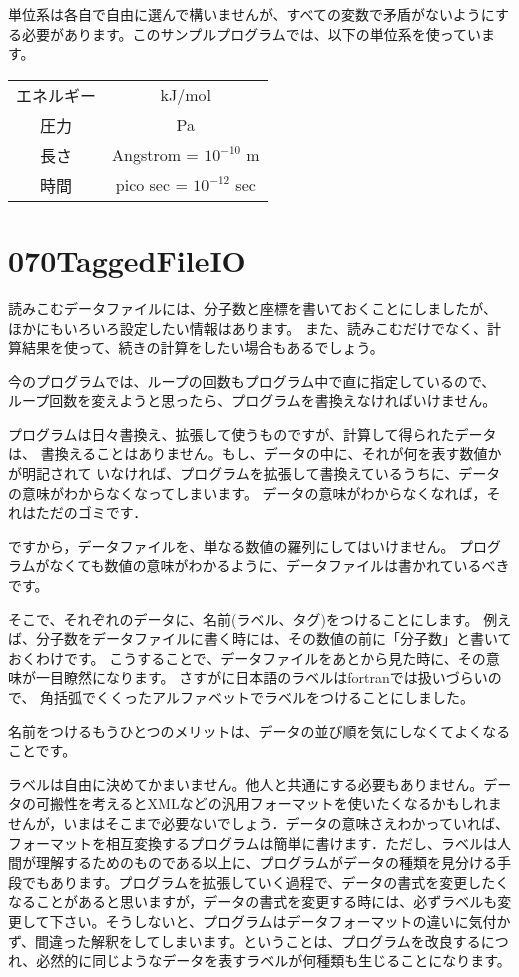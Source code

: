\documentclass[a4,10pt]{article}
\begin{document}
単位系は各自で自由に選んで構いませんが、すべての変数で矛盾がないようにする必要があります。このサンプルプログラムでは、以下の単位系を使っています。
\begin{center}
\begin{tabular}{cc}
\hline
 エネルギー&kJ/mol\\
 圧力&Pa\\
 長さ&Angstrom = $10^{-10}$ m\\
 時間&pico sec = $10^{-12}$ sec\\
 \hline
 \end{tabular}
\end{center}

\section{070TaggedFileIO}

読みこむデータファイルには、分子数と座標を書いておくことにしましたが、
ほかにもいろいろ設定したい情報はあります。
また、読みこむだけでなく、計算結果を使って、続きの計算をしたい場合もあるでしょう。

今のプログラムでは、ループの回数もプログラム中で直に指定しているので、
ループ回数を変えようと思ったら、プログラムを書換えなければいけません。

プログラムは日々書換え、拡張して使うものですが、計算して得られたデータは、
書換えることはありません。もし、データの中に、それが何を表す数値かが明記されて
いなければ、プログラムを拡張して書換えているうちに、データの意味がわからなくなってしまいます。
データの意味がわからなくなれば，それはただのゴミです．

ですから，データファイルを、単なる数値の羅列にしてはいけません。
プログラムがなくても数値の意味がわかるように、データファイルは書かれているべきです。

そこで、それぞれのデータに、名前(ラベル、タグ)をつけることにします。
例えば、分子数をデータファイルに書く時には、その数値の前に「分子数」と書いておくわけです。
こうすることで、データファイルをあとから見た時に、その意味が一目瞭然になります。
さすがに日本語のラベルはfortranでは扱いづらいので、
角括弧でくくったアルファベットでラベルをつけることにしました。

名前をつけるもうひとつのメリットは、データの並び順を気にしなくてよくなることです。

ラベルは自由に決めてかまいません。他人と共通にする必要もありません。データの可搬性を考えるとXMLなどの汎用フォーマットを使いたくなるかもしれませんが，いまはそこまで必要ないでしょう．データの意味さえわかっていれば、フォーマットを相互変換するプログラムは簡単に書けます．ただし、ラベルは人間が理解するためのものである以上に、プログラムがデータの種類を見分ける手段でもあります。プログラムを拡張していく過程で、データの書式を変更したくなることがあると思いますが，データの書式を変更する時には、必ずラベルも変更して下さい。そうしないと、プログラムはデータフォーマットの違いに気付かず、間違った解釈をしてしまいます。ということは、プログラムを改良するにつれ、必然的に同じようなデータを表すラベルが何種類も生じることになります。
\end{document}
